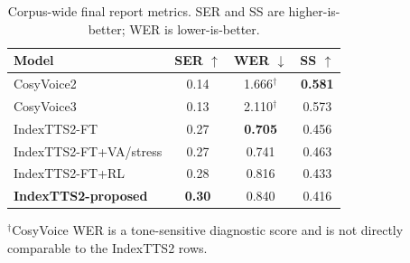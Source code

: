 \begin{table}
    \centering
    \caption{Corpus-wide final report metrics. SER and SS are higher-is-better; WER is lower-is-better.}
    \renewcommand{\arraystretch}{1.12}
    \begin{tabular*}{\linewidth}{@{\extracolsep{\fill}}lccc}
      \toprule
      \textbf{Model} & \textbf{SER $\uparrow$} & \textbf{WER $\downarrow$} & \textbf{SS $\uparrow$} \\
      \midrule
      CosyVoice2 & 0.14 & 1.666$^{\dagger}$ & \textbf{0.581} \\
      CosyVoice3 & 0.13 & 2.110$^{\dagger}$ & 0.573 \\
      \midrule
      IndexTTS2-FT & 0.27 & \textbf{0.705} & 0.456 \\
      IndexTTS2-FT+VA/stress & 0.27 & 0.741 & 0.463 \\
      IndexTTS2-FT+RL & 0.28 & 0.816 & 0.433 \\
      \textbf{IndexTTS2-proposed} & \textbf{0.30} & 0.840 & 0.416 \\
      \bottomrule
    \end{tabular*}
    \vspace{0.25em}
    {\small $^{\dagger}$CosyVoice WER is a tone-sensitive diagnostic score and is not directly comparable to the IndexTTS2 rows.}
    \label{tab:final-report-metrics}
\end{table}
